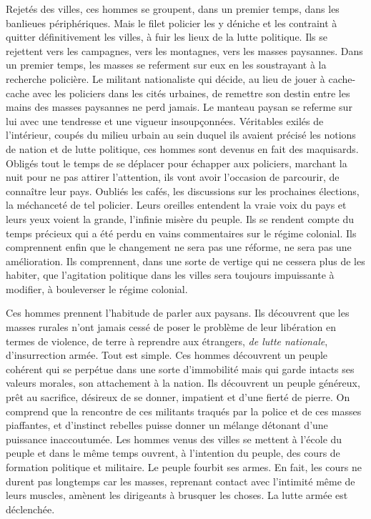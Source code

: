 \documentclass[french,twoside]{book} %
\begin{document}
Rejetés des villes, ces hommes se groupent, dans un premier temps, dans les banlieues périphériques. Mais le filet policier les y déniche et les contraint à quitter définitivement les villes, à fuir les lieux de la lutte politique. Ils se rejettent vers les campagnes, vers les montagnes, vers les masses paysannes. Dans un   premier temps, les masses se referment sur eux en les soustrayant à la recherche policière. Le militant nationaliste qui décide, au lieu de jouer à cache-cache avec les policiers dans les cités urbaines, de remettre son destin entre les mains des masses paysannes ne perd jamais. Le manteau paysan se referme sur lui avec une tendresse et une vigueur insoupçonnées. Véritables exilés de l’intérieur, coupés du milieu urbain au sein duquel ils avaient précisé les notions de nation et de lutte politique, ces hommes sont devenus en fait des maquisards. Obligés tout le temps de se déplacer pour échapper aux policiers, marchant la nuit pour ne pas attirer l’attention, ils vont avoir l’occasion de parcourir, de connaître leur pays. Oubliés les cafés, les discussions sur les prochaines élections, la méchanceté de tel policier. Leurs oreilles entendent la vraie voix du pays et leurs yeux voient la grande, l’infinie misère du peuple. Ils se rendent compte du temps précieux qui a été perdu en vains commentaires sur le régime colonial. Ils comprennent enfin que le changement ne sera pas une réforme, ne sera pas une amélioration. Ils comprennent, dans une sorte de vertige qui ne cessera plus de les habiter, que l’agitation politique dans les villes sera toujours impuissante à modifier, à bouleverser le régime colonial.\par
Ces hommes prennent l’habitude de parler aux paysans. Ils découvrent que les masses rurales n’ont jamais cessé de poser le problème de leur libération en termes de violence, de terre à reprendre aux étrangers, \emph{de lutte nationale}, d’insurrection armée. Tout est simple. Ces hommes découvrent un peuple cohérent qui se perpétue dans une sorte d’immobilité mais qui garde intacts ses valeurs morales, son attachement à la nation. Ils découvrent un peuple généreux, prêt au sacrifice, désireux de se donner, impatient et d’une fierté de pierre. On comprend que la rencontre de ces militants traqués par la police et de ces masses piaffantes, et d’instinct rebelles puisse donner un mélange détonant d’une puissance inaccoutumée. Les hommes venus des villes se mettent à l’école du peuple et dans le même temps ouvrent, à l’intention du peuple, des cours de formation politique et militaire. Le peuple fourbit ses armes. En fait, les   cours ne durent pas longtemps car les masses, reprenant contact avec l’intimité même de leurs muscles, amènent les dirigeants à brusquer les choses. La lutte armée est déclenchée.\par
\end{document}
